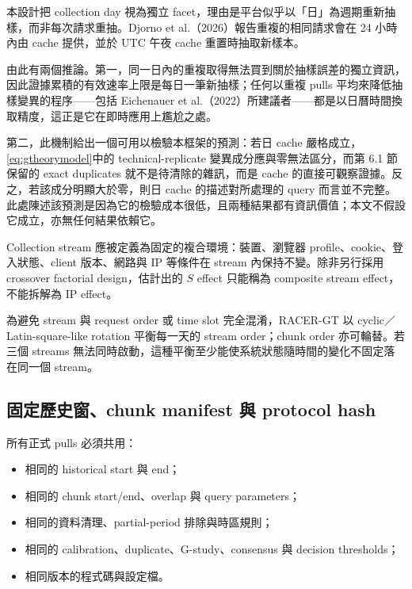 \documentclass[12pt,a4paper,oneside]{article}
\begin{document}
\begin{remark}
\label{rem:cache}
本設計把 collection day 視為獨立 facet，理由是平台似乎以「日」為週期重新抽樣，而非每次請求重抽。Djorno et al.（2026）報告重複的相同請求會在 24 小時內由 cache 提供，並於 UTC 午夜 cache 重置時抽取新樣本。

由此有兩個推論。第一，同一日內的重複取得無法買到關於抽樣誤差的獨立資訊，因此證據累積的有效速率上限是每日一筆新抽樣；任何以重複 pulls 平均來降低抽樣變異的程序——包括 Eichenauer et al.（2022）所建議者——都是以日曆時間換取精度，這正是它在即時應用上尷尬之處。

第二，此機制給出一個可用以檢驗本框架的預測：若日 cache 嚴格成立，\cref{eq:gtheorymodel}中的 technical-replicate 變異成分應與零無法區分，而第 6.1 節保留的 exact duplicates 就不是待清除的雜訊，而是 cache 的直接可觀察證據。反之，若該成分明顯大於零，則日 cache 的描述對所處理的 query 而言並不完整。此處陳述該預測是因為它的檢驗成本很低，且兩種結果都有資訊價值；本文不假設它成立，亦無任何結果依賴它。
\end{remark}

Collection stream 應被定義為固定的複合環境：裝置、瀏覽器 profile、cookie、登入狀態、client 版本、網路與 IP 等條件在 stream 內保持不變。除非另行採用 crossover factorial design，估計出的 $S$ effect 只能稱為 composite stream effect，不能拆解為 IP effect。

為避免 stream 與 request order 或 time slot 完全混淆，RACER-GT 以 cyclic／Latin-square-like rotation 平衡每一天的 stream order；chunk order 亦可輪替。若三個 streams 無法同時啟動，這種平衡至少能使系統狀態隨時間的變化不固定落在同一個 stream。

\subsection{固定歷史窗、chunk manifest 與 protocol hash}

所有正式 pulls 必須共用：
\begin{itemize}
  \item 相同的 historical start 與 end；
  \item 相同的 chunk start/end、overlap 與 query parameters；
  \item 相同的資料清理、partial-period 排除與時區規則；
  \item 相同的 calibration、duplicate、G-study、consensus 與 decision thresholds；
  \item 相同版本的程式碼與設定檔。
\end{itemize}
\end{document}
